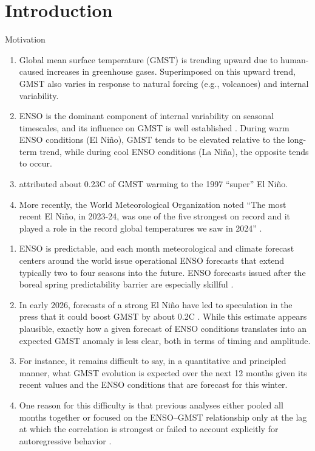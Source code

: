 \documentclass[aspectratio=169,xcolor=dvipsnames]{beamer}
\begin{document}
\setcounter{section}{0}
\section{Introduction}

\begin{frame}{Motivation}
  \begin{enumerate}\tiny 
  \item Global mean surface temperature (GMST) is trending upward due
    to human-caused increases in greenhouse gases. Superimposed on
    this upward trend, GMST also varies in response to natural forcing
    (e.g., volcanoes) and internal variability.
  \item ENSO is the dominant component of internal variability on
    seasonal timescales, and its influence on GMST is well established
    \citep[e.g.,][]{Trenberth2002evolution}. During warm ENSO
    conditions (El Ni\~no), GMST tends to be elevated relative to the
    long-term trend, while during cool ENSO conditions (La Ni\~na),
    the opposite tends to occur.
  \item \citet{Lean2008natural} attributed about 0.23\textdegree C of
    GMST warming to the 1997 ``super'' El Ni\~no.
  \item More recently, the World Meteorological Organization noted
    ``The most recent El Ni\~no, in 2023-24, was one of the five
    strongest on record and it played a role in the record global
    temperatures we saw in 2024'' \citep{WMO2026enso}.

  \end{enumerate}

  \begin{enumerate}\tiny
  \item ENSO is predictable, and each month meteorological and climate
    forecast centers around the world issue operational ENSO forecasts
    that extend typically two to four seasons into the future.  ENSO
    forecasts issued after the boreal spring predictability barrier
    are especially skillful \citep[e.g.,][]{Heureux:Chapter}.
  \item In early 2026, forecasts of a strong El Ni\~no have led to
    speculation in the press that it could boost GMST by about
    0.2\textdegree C \citep[e.g.,][]{KeithLucas2026SuperElNino}.
    While this estimate appears plausible, exactly how a given
    forecast of ENSO conditions translates into an expected GMST
    anomaly is less clear, both in terms of timing and amplitude.
  \item For instance, it remains difficult to say, in a quantitative
    and principled manner, what GMST evolution is expected over the
    next 12 months given its recent values and the ENSO conditions
    that are forecast for this winter.
  \item One reason for this difficulty is that previous analyses
    either pooled all months together \citep{Trenberth2002evolution}
    or focused on the ENSO–GMST relationship only at the lag at which
    the correlation is strongest or failed to account explicitly for
    autoregressive behavior \citep{Lean2008natural,Foster2011global}.
  \end{enumerate}
  

\end{frame}
\end{document}
